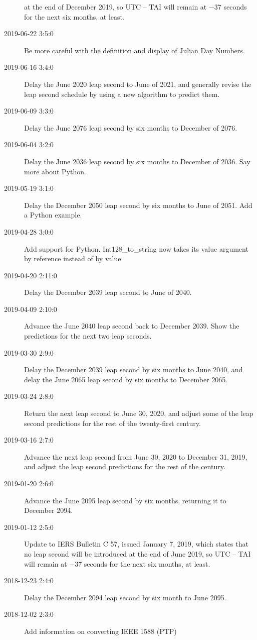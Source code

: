 \documentclass[letterpaper,twoside]{article}
\begin{document}
\begin{description}
  at the end of December 2019, so UTC -- TAI will remain at
  \num{-37} seconds for the next six months, at least.  
\item[2019-06-22 3:5:0] Be more careful with the definition
  and display of Julian Day Numbers.
\item[2019-06-16 3:4:0] Delay the June 2020 leap second to
  June of 2021, and generally revise the leap second schedule
  by using a new algorithm to predict them.
\item[2019-06-09 3:3:0] Delay the June 2076 leap second by
  six months to December of 2076.
\item[2019-06-04 3:2:0] Delay the June 2036 leap second by
  six months to December of 2036.  Say more about Python.
\item[2019-05-19 3:1:0] Delay the December 2050 leap second
  by six months to June of 2051.  Add a Python example.
\item[2019-04-28 3:0:0] Add support for Python.  Int128\_to\_string
  now takes its value argument by reference instead of by value.
\item[2019-04-20 2:11:0] Delay the December 2039 leap second
  to June of 2040.
\item[2019-04-09 2:10:0] Advance the June 2040 leap second back to
  December 2039.  Show the predictions for the next two leap seconds.
\item[2019-03-30 2:9:0] Delay the December 2039 leap second by six
  months to June 2040, and delay the June 2065 leap second by six
  months to December 2065.
\item[2019-03-24 2:8:0] Return the next leap second to June 30, 2020,
  and adjust some of the leap second predictions for the rest of the
  twenty-first century.
\item[2019-03-16 2:7:0] Advance the next leap second from June 30, 2020
  to December 31, 2019, and adjust the leap second predictions
  for the rest of the century.
\item[2019-01-20 2:6:0] Advance the June 2095 leap second by six
  months, returning it to December 2094.
\item[2019-01-12 2:5:0] Update to IERS Bulletin C 57, issued January
  7, 2019, which states that no leap second will be introduced
  at the end of June 2019, so UTC -- TAI will remain at
  \num{-37} seconds for the next six months, at least.  
\item[2018-12-23 2:4:0] Delay the December 2094 leap second by six month
  to June 2095.
\item[2018-12-02 2:3:0] Add information on converting IEEE 1588 (PTP)

\end{description}
\end{document}
